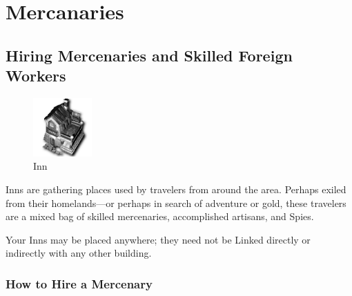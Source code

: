 
\chapter{Mercanaries}

\section{Hiring Mercenaries and Skilled Foreign Workers}

\begin{figure}
	\vspace{-20pt}
	\begin{center}
		\includegraphics[width=0.2\textwidth]{Iinn}
		\\ Inn
	\end{center}
	\vspace{-20pt}
\end{figure}

Inns are gathering places used by travelers from around the area. Perhaps exiled from their homelands---or perhaps in search of adventure or gold, these travelers are a mixed bag of skilled mercenaries, accomplished artisans, and Spies.

Your Inns may be placed anywhere; they need not be Linked directly or indirectly with any other building.

\subsection{How to Hire a Mercenary}

